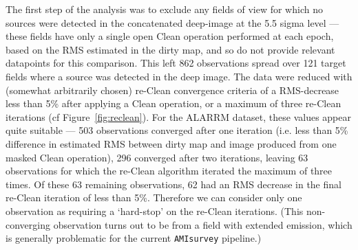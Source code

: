 \documentclass[5p,authoryear]{elsarticle}
\begin{document}
The first step of the analysis was to exclude any fields of view for which no sources were detected in the concatenated deep-image at the 5.5 sigma level --- these fields have only a single open Clean operation performed at each epoch, based on the RMS estimated in the dirty map, and so do not provide relevant datapoints for this comparison.
This left 862 observations spread over 121 target fields where a source was detected in the deep image.
The data were reduced with (somewhat arbitrarily chosen) re-Clean convergence criteria of a RMS-decrease less than 5\% after applying a Clean operation, or a maximum of three re-Clean iterations (cf Figure~\ref{fig:reclean}). 
For the ALARRM dataset, these values appear quite suitable --- 503 observations converged after one iteration (i.e. less than 5\% difference in estimated RMS between dirty map and image produced from one masked Clean operation), 296 converged after two iterations, leaving 63 observations for which the re-Clean algorithm iterated the maximum of three times. 
Of these 63 remaining observations, 62 had an RMS decrease in the final re-Clean iteration of less than 5\%. Therefore we can consider only one observation as requiring a `hard-stop' on the re-Clean iterations. 
(This non-converging observation turns out to be from a field with extended emission, which is generally problematic for the current \texttt{AMIsurvey} pipeline.)
\end{document}
